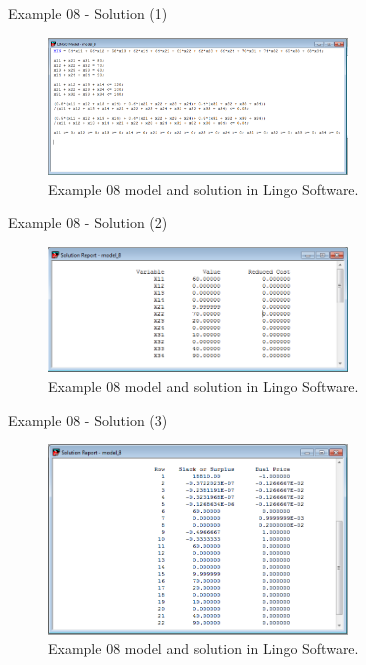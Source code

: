 \begin{frame}{Example 08 - Solution (1)}
\begin{figure}
    \includegraphics[width=300px]{slides/ex08/screenshot_a.png}
    \caption{Example 08 model and solution in Lingo Software.}
\end{figure}
\end{frame}

\begin{frame}{Example 08 - Solution (2)}
\begin{figure}
    \includegraphics[width=300px]{slides/ex08/screenshot_b.png}
    \caption{Example 08 model and solution in Lingo Software.}
\end{figure}
\end{frame}

\begin{frame}{Example 08 - Solution (3)}
\begin{figure}
    \includegraphics[width=300px]{slides/ex08/screenshot_c.png}
    \caption{Example 08 model and solution in Lingo Software.}
\end{figure}
\end{frame}

